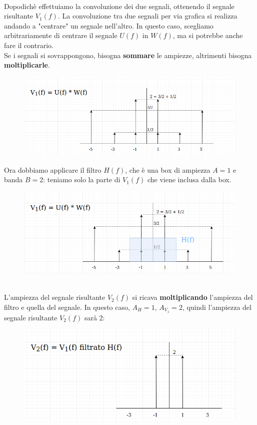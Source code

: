 \documentclass[12pt,a4paper]{article}
\begin{document}
	\\Dopodich\`e effettuiamo la convoluzione dei due segnali, ottenendo il segnale risultante $V_1(f)$. La convoluzione tra due segnali per via grafica si realizza andando a "centrare" un segnale nell'altro. In questo caso, scegliamo arbitrariamente di centrare il segnale $U(f)$ in $W(f)$, ma si potrebbe anche fare il contrario.\\Se i segnali si sovrappongono, bisogna \textbf{sommare} le ampiezze, altrimenti bisogna \textbf{moltiplicarle}.
	\begin{figure}[h!]
		\centering
		\includegraphics[scale=0.4]{./images/fourier53.png}
	\end{figure}
	\newpage Ora dobbiamo applicare il filtro $H(f)$, che \`e una box di ampiezza $A=1$ e banda $B=2$: teniamo solo la parte di $V_1(f)$ che viene inclusa dalla box.
	\begin{figure}[h!]
		\centering
		\includegraphics[scale=0.4]{./images/fourier54.png}
	\end{figure}
	\\L'ampiezza del segnale risultante $V_2(f)$ si ricava \textbf{moltiplicando} l'ampiezza del filtro e quella del segnale. In questo caso, $A_H = 1$, $A_{V_1} = 2$, quindi l'ampiezza del segnale risultante $V_2(f)$ sar\`a 2:
	\begin{figure}[h!]
		\centering
		\includegraphics[scale=0.4]{./images/fourier55.png}
	\end{figure}
\end{document}

